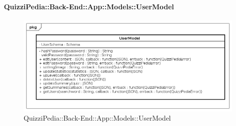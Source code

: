 \paragraph{QuizziPedia::Back-End::App::Models::UserModel}
\label{QuizziPedia::Back-End::App::Models::UserModel}
\begin{figure}
	\centering
	\includegraphics[scale=0.45]{UML/Classi/Back-End/QuizziPedia_Back-End_App_Models_userModel.png}
	\caption{QuizziPedia::Back-End::App::Models::UserModel}
\end{figure}
\FloatBarrier
